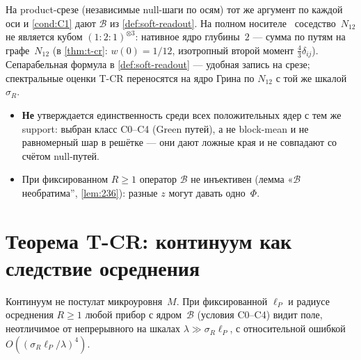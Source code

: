 \begin{remark}
На product-срезе (независимые null-шаги по осям) тот же аргумент по каждой оси
и \ref{cond:C1} дают $\mathcal{B}$ из \cref{def:soft-readout}.
На полном носителе \latGCKshort\ соседство~$N_{12}$ не является кубом $(1{:}2{:}1)^{\otimes 3}$:
нативное ядро глубины~$2$ --- сумма по путям на графе~$N_{12}$
(в \cref{thm:t-cr}: $w(0)=1/12$, изотропный второй момент $\tfrac43\delta_{ij}$).
Сепарабельная формула в \cref{def:soft-readout} --- удобная запись на срезе;
спектральные оценки T-CR переносятся на ядро Грина по $N_{12}$ с той же шкалой~$\sigma_R$.
\end{remark}

\begin{remark}
\begin{itemize}[nosep]
\item \textbf{Не} утверждается единственность среди всех положительных ядер с тем же support:
  выбран класс C0--C4 (Green путей), а не block-mean и не равномерный шар в решётке ---
  они дают ложные края и не совпадают со счётом null-путей.
\item При фиксированном $R\ge 1$ оператор $\mathcal{B}$ не инъективен
  (лемма «$\mathcal{B}$ необратима'', \cref{lem:236}): разные $z$ могут давать одно~$\Phi$.
\end{itemize}
\end{remark}

\section{Теорема T-CR: континуум как следствие осреднения}
\label{sec:t-cr}

\begin{theorem}[T-CR]
\label{thm:t-cr}
Континуум не постулат микроуровня~$M$.
При фиксированной $\ell_P$ и радиусе осреднения $R\ge 1$
любой прибор с ядром~$\mathcal{B}$ (условия C0--C4) видит поле,
неотличимое от непрерывного на шкалах $\lambda\gg\sigma_R\ell_P$,
с относительной ошибкой $O((\sigma_R\ell_P/\lambda)^4)$.
\end{theorem}

